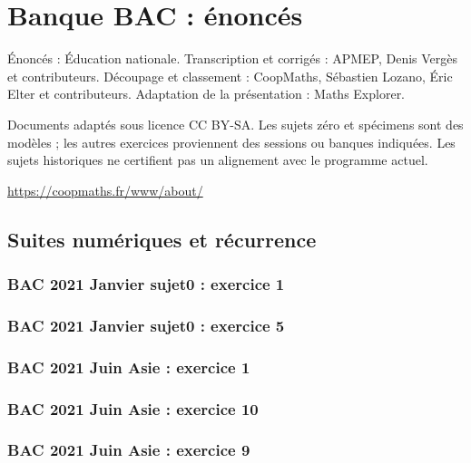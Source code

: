 \documentclass[lang=fr,edition=teacher,layout=sheet]{mxbook}
\begin{document}
\chapter*{Banque BAC : énoncés}
Énoncés : Éducation nationale. Transcription et corrigés : APMEP, Denis Vergès et contributeurs. Découpage et classement : CoopMaths, Sébastien Lozano, Éric Elter et contributeurs. Adaptation de la présentation : Maths Explorer.\par\medskip
\noindent Documents adaptés sous licence CC BY-SA. Les sujets zéro et spécimens sont des modèles ; les autres exercices proviennent des sessions ou banques indiquées. Les sujets historiques ne certifient pas un alignement avec le programme actuel.
\par\smallskip\url{https://coopmaths.fr/www/about/}
\clearpage\section*{Suites numériques et récurrence}
\subsection*{BAC 2021 Janvier sujet0 : exercice 1}
\begingroup\endgroup
\par\bigskip
{}\subsection*{BAC 2021 Janvier sujet0 : exercice 5}
\begingroup\endgroup
\par\bigskip
{}\subsection*{BAC 2021 Juin Asie : exercice 1}
\begingroup\endgroup
\par\bigskip
{}\subsection*{BAC 2021 Juin Asie : exercice 10}
\begingroup\endgroup
\par\bigskip
{}\subsection*{BAC 2021 Juin Asie : exercice 9}
\end{document}
